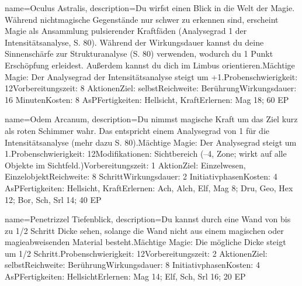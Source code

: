 {
    name={Oculus Astralis},
    description={Du wirfst einen Blick in die Welt der Magie. Während nichtmagische Gegenstände nur schwer zu erkennen sind, erscheint Magie als Ansammlung pulsierender Kraftfäden (Analysegrad 1 der Intensitätsanalyse, S. 80). Während der Wirkungsdauer kannst du deine Sinnenschärfe zur Strukturanalyse (S. 80) verwenden, wodurch du 1 Punkt Erschöpfung erleidest. Außerdem kannst du dich im Limbus orientieren.\newline Mächtige Magie: Der Analysegrad der Intensitätsanalyse steigt um +1.\newline Probenschwierigkeit: 12\newline Vorbereitungszeit: 8 Aktionen\newline Ziel: selbst\newline Reichweite: Berührung\newline Wirkungsdauer: 16 Minuten\newline Kosten: 8 AsP\newline Fertigkeiten: Hellsicht, Kraft\newline Erlernen: Mag 18; 60 EP}
}


{
    name={Odem Arcanum},
    description={Du nimmst magische Kraft um das Ziel kurz als roten Schimmer wahr. Das entspricht einem Analysegrad von 1 für die Intensitätsanalyse (mehr dazu S. 80).\newline Mächtige Magie: Der Analysegrad steigt um 1.\newline Probenschwierigkeit: 12\newline Modifikationen: Sichtbereich (–4, Zone; wirkt auf alle Objekte im Sichtfeld.)\newline Vorbereitungszeit: 1 Aktion\newline Ziel: Einzelwesen, Einzelobjekt\newline Reichweite: 8 Schritt\newline Wirkungsdauer: 2 Initiativphasen\newline Kosten: 4 AsP\newline Fertigkeiten: Hellsicht, Kraft\newline Erlernen: Ach, Alch, Elf, Mag 8; Dru, Geo, Hex 12; Bor, Sch, Srl 14; 40 EP}
}


{
    name={Penetrizzel Tiefenblick},
    description={Du kannst durch eine Wand von bis zu 1/2 Schritt Dicke sehen, solange die Wand nicht aus einem magischen oder magieabweisenden Material besteht.\newline Mächtige Magie: Die mögliche Dicke steigt um 1/2 Schritt.\newline Probenschwierigkeit: 12\newline Vorbereitungszeit: 2 Aktionen\newline Ziel: selbst\newline Reichweite: Berührung\newline Wirkungsdauer: 8 Initiativphasen\newline Kosten: 4 AsP\newline Fertigkeiten: Hellsicht\newline Erlernen: Mag 14; Elf, Sch, Srl 16; 20 EP}
}



